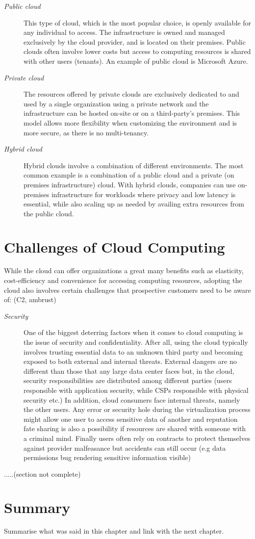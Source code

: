 \begin{description}
	\item [\textit{Public cloud}] This type of cloud, which is the most popular choice, is openly available for any individual to access. The infrastructure is owned and managed exclusively by the cloud provider, and is located on their premises. Public clouds often involve lower costs but access to computing resources is shared with other users (tenants). An example of public cloud is Microsoft Azure.
	
	\item [\textit{Private cloud}] The resources offered by private clouds are exclusively dedicated to and used by a single organization using a private network and the infrastructure can be hosted on-site or on a third-party's premises. This model allows more flexibility when customizing the environment and is more secure, as there is no multi-tenancy.
	
	\item [\textit{Hybrid cloud}] Hybrid clouds involve a combination of different environments. The most common example is a combination of a public cloud and a private (on premises infrastructure) cloud. With hybrid clouds, companies can use on-premises infrastructure for workloads where privacy and low latency is essential, while also scaling up as needed by availing extra resources from the public cloud. 
\end{description}


\section{Challenges of Cloud Computing}
While the cloud can offer organizations a great many benefits such as elasticity, cost-efficiency and convenience for accessing computing resources, adopting the cloud also involves certain challenges that prospective customers need to be aware of: (C2, ambrust)

\begin{description}
	\item [\textit{Security}] One of the biggest deterring factors when it comes to cloud computing is the issue of security and confidentiality. After all, using the cloud typically involves trusting essential data to an unknown third party and becoming exposed to both external and internal threats. External dangers are no different than those that any large data center faces but, in the cloud, security responsibilities are distributed among different parties (users responsible with application security, while CSPs responsible with physical security etc.) In addition, cloud consumers face internal threats, namely the other users. Any error or security hole during the virtualization process might allow one user to access sensitive data of another and reputation fate sharing is also a possibility if resources are shared with someone with a criminal mind. Finally users often rely on contracts to protect themselves against provider malfeasance but accidents can still occur (e.g data permissions bug rendering sensitive information visible)
	
\end{description}

.....(section not complete)



\section{Summary}
Summarise what was said in this chapter and link with the next chapter.